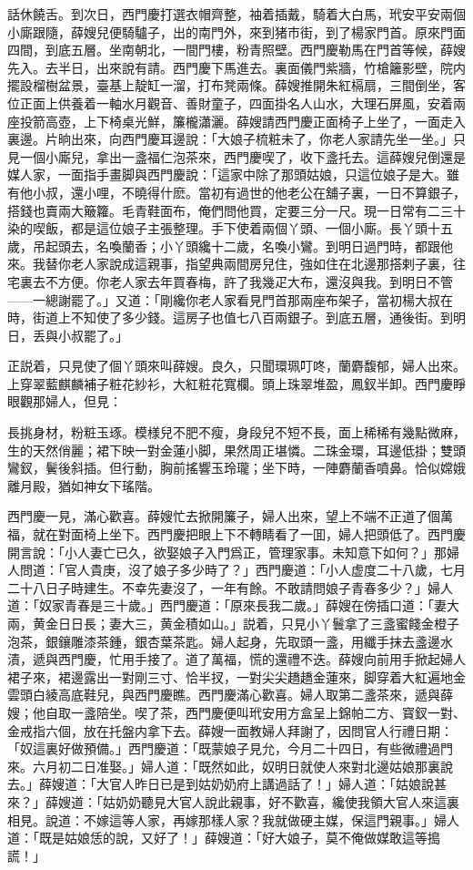 話休饒舌。到次日，西門慶打選衣帽齊整，袖着插戴，騎着大白馬，玳安平安兩個小廝跟隨，薛嫂兒便騎驢子，出的南門外，來到猪市街，到了楊家門首。原來門面四間，到底五層。坐南朝北，一間門樓，粉青照壁。西門慶勒馬在門首等候，薛嫂先入。去半日，出來說有請。西門慶下馬進去。裏面儀門紫牆，竹槍籬影壁，院内擺設榴樹盆景，臺基上靛缸一溜，打布凳兩條。薛嫂推開朱紅槅扇，三間倒坐，客位正面上供養着一軸水月觀音、善財童子，四面掛名人山水，大理石屏風，安着兩座投箭高壺，上下椅桌光鮮，簾櫳瀟灑。薛嫂請西門慶正面椅子上坐了，一面走入裏邊。片晌出來，向西門慶耳邊說：「大娘子梳粧未了，你老人家請先坐一坐。」只見一個小廝兒，拿出一盞福仁泡茶來，西門慶喫了，收下盞托去。這薛嫂兒倒還是媒人家，一面指手畫脚與西門慶說：「這家中除了那頭姑娘，只這位娘子是大。雖有他小叔，還小哩，不曉得什麽。當初有過世的他老公在舖子裏，一日不算銀子，搭錢也賣兩大簸籮。毛青鞋面布，俺們問他買，定要三分一尺。現一日常有二三十染的喫飯，都是這位娘子主張整理。手下使着兩個丫頭、一個小廝。長丫頭十五歲，吊起頭去，名喚蘭香；小丫頭纔十二歲，名喚小鸞。到明日過門時，都跟他來。我替你老人家說成這親事，指望典兩間房兒住，強如住在北邊那搭剌子裏，往宅裏去不方便。你老人家去年買春梅，許了我幾疋大布，還沒與我。到明日不管——一總謝罷了。」又道：「剛纔你老人家看見門首那兩座布架子，當初楊大叔在時，街道上不知使了多少錢。這房子也值七八百兩銀子。到底五層，通後街。到明日，丢與小叔罷了。」

正説着，只見使了個丫頭來叫薛嫂。良久，只聞環珮叮咚，蘭麝馥郁，婦人出來。上穿翠藍麒麟補子粧花紗衫，大紅粧花寬欄。頭上珠翠堆盈，鳳釵半卸。西門慶睜眼觀那婦人，但見：

\begin{myquote}
長挑身材，粉粧玉琢。模様兒不肥不瘦，身段兒不短不長，面上稀稀有幾點微麻，生的天然俏麗；裙下映一對金蓮小脚，果然周正堪憐。二珠金環，耳邊低掛；雙頭鸞釵，鬢後斜插。但行動，胸前搖響玉玲瓏；坐下時，一陣麝蘭香噴鼻。恰似嫦娥離月殿，猶如神女下瑤階。
\end{myquote}

西門慶一見，滿心歡喜。薛嫂忙去掀開簾子，婦人出來，望上不端不正道了個萬福，就在對面椅上坐下。西門慶把眼上下不轉睛看了一囬，婦人把頭低了。西門慶開言說：「小人妻亡已久，欲娶娘子入門爲正，管理家事。未知意下如何？」那婦人問道：「官人貴庚，沒了娘子多少時了？」西門慶道：「小人虚度二十八歲，七月二十八日子時建生。不幸先妻沒了，一年有餘。不敢請問娘子青春多少？」婦人道：「奴家青春是三十歲。」西門慶道：「原來長我二歲。」薛嫂在傍插口道：「妻大兩，黄金日日長；妻大三，黄金積如山。」説着，只見小丫鬟拿了三盞蜜餞金橙子泡茶，銀鑲雕漆茶鍾，銀杏葉茶匙。婦人起身，先取頭一盞，用纖手抹去盞邊水漬，遞與西門慶，忙用手接了。道了萬福，慌的還禮不迭。薛嫂向前用手掀起婦人裙子來，裙邊露出一對剛三寸、恰半扠，一對尖尖趫趫金蓮來，脚穿着大紅遍地金雲頭白綾高底鞋兒，與西門慶瞧。西門慶滿心歡喜。婦人取第二盞茶來，遞與薛嫂；他自取一盞陪坐。喫了茶，西門慶便叫玳安用方盒呈上錦帕二方、寳釵一對、金戒指六個，放在托盤内拿下去。薛嫂一面教婦人拜謝了，因問官人行禮日期：「奴這裏好做預備。」西門慶道：「既蒙娘子見允，今月二十四日，有些微禮過門來。六月初二日准娶。」婦人道：「既然如此，奴明日就使人來對北邊姑娘那裏說去。」薛嫂道：「大官人昨日已是到姑奶奶府上講過話了！」婦人道：「姑娘說甚來？」薛嫂道：「姑奶奶聽見大官人說此親事，好不歡喜，纔使我領大官人來這裏相見。說道：不嫁這等人家，再嫁那樣人家？我就做硬主媒，保這門親事。」婦人道：「既是姑娘恁的說，又好了！」薛嫂道：「好大娘子，莫不俺做媒敢這等搗謊！」

